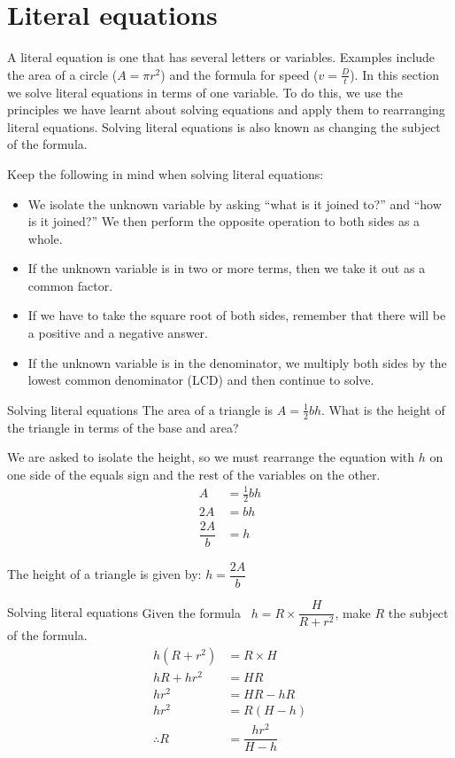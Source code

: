 \section{Literal equations}

A literal equation is one that has several letters or variables. Examples include the area of a circle ($A=\pi{r}^{2}$) and the formula for speed ($v=\frac{D}{t}$). In this section we solve literal equations in terms of one variable. To do this, we use the principles we have learnt about solving equations and apply them to rearranging literal equations. Solving literal equations is also known as changing the subject of the formula.
 
Keep the following in mind when solving literal equations:
\begin{itemize}
\item We isolate the unknown variable by asking ``what is it joined to?'' and ``how is it joined?'' We then perform the opposite operation to both sides as a whole.
\item If the unknown variable is in two or more terms, then we take it out as a common factor. 
\item  If we have to take the square root of both sides, remember that there will be a positive and a negative answer.
\item  If the unknown variable is in the denominator, we multiply both sides by the lowest common denominator (LCD) and then continue to solve.
\end{itemize}

\begin{wex}
{Solving literal equations}
{The area of a triangle is $A=\frac{1}{2}bh$. What is the height of the triangle in terms of the base and area?}
{
We are asked to isolate the height, so we must rearrange the equation with $h$ on one side of the equals sign and the rest of the variables on the other.
\begin{align*}
  A &= \frac{1}{2}bh \\
  2A &= bh \\
  \dfrac{2A}{b} &= h
\end{align*}

The height of a triangle is given by: $h=\dfrac{2A}{b}$
} 
\end{wex}

\begin{wex}
{Solving literal equations}
{Given the formula ~$h=  R\times \dfrac{H}{R+r^2}$, make $R$ the subject of the formula.}
{
\begin{align*}
  h(R+r^2) &= R \times H \\
  hR + hr^2 &= HR \\
  hr^2 &= HR - hR \\
  hr^2 &= R(H - h) \\
  \therefore R &= \dfrac{hr^2}{H-h}
\end{align*}
} 
\end{wex}

